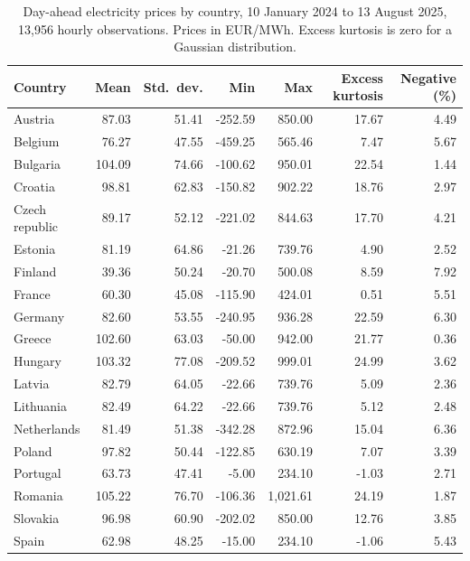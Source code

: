 \begin{table}[htbp]
\centering
\small
\caption{Day-ahead electricity prices by country, 10 January 2024 to 13 August 2025, 13,956 hourly observations. Prices in EUR/MWh. Excess kurtosis is zero for a Gaussian distribution.}
\label{tab:summary-stats}
\begin{tabular}{@{}lrrrrrr@{}}
\toprule
Country & Mean & Std.\ dev. & Min & Max & Excess kurtosis & Negative (\%) \\
\midrule
Austria & 87.03 & 51.41 & -252.59 & 850.00 & 17.67 & 4.49 \\
Belgium & 76.27 & 47.55 & -459.25 & 565.46 & 7.47 & 5.67 \\
Bulgaria & 104.09 & 74.66 & -100.62 & 950.01 & 22.54 & 1.44 \\
Croatia & 98.81 & 62.83 & -150.82 & 902.22 & 18.76 & 2.97 \\
Czech republic & 89.17 & 52.12 & -221.02 & 844.63 & 17.70 & 4.21 \\
Estonia & 81.19 & 64.86 & -21.26 & 739.76 & 4.90 & 2.52 \\
Finland & 39.36 & 50.24 & -20.70 & 500.08 & 8.59 & 7.92 \\
France & 60.30 & 45.08 & -115.90 & 424.01 & 0.51 & 5.51 \\
Germany & 82.60 & 53.55 & -240.95 & 936.28 & 22.59 & 6.30 \\
Greece & 102.60 & 63.03 & -50.00 & 942.00 & 21.77 & 0.36 \\
Hungary & 103.32 & 77.08 & -209.52 & 999.01 & 24.99 & 3.62 \\
Latvia & 82.79 & 64.05 & -22.66 & 739.76 & 5.09 & 2.36 \\
Lithuania & 82.49 & 64.22 & -22.66 & 739.76 & 5.12 & 2.48 \\
Netherlands & 81.49 & 51.38 & -342.28 & 872.96 & 15.04 & 6.36 \\
Poland & 97.82 & 50.44 & -122.85 & 630.19 & 7.07 & 3.39 \\
Portugal & 63.73 & 47.41 & -5.00 & 234.10 & -1.03 & 2.71 \\
Romania & 105.22 & 76.70 & -106.36 & 1,021.61 & 24.19 & 1.87 \\
Slovakia & 96.98 & 60.90 & -202.02 & 850.00 & 12.76 & 3.85 \\
Spain & 62.98 & 48.25 & -15.00 & 234.10 & -1.06 & 5.43 \\
\bottomrule
\end{tabular}
\end{table}
